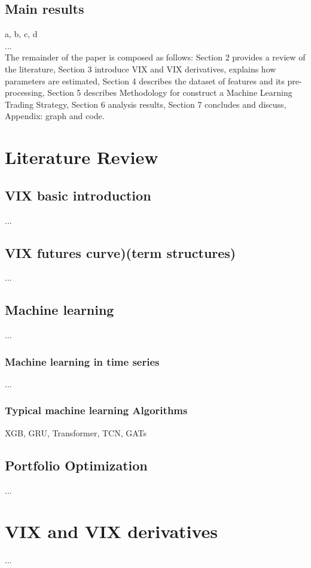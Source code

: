 \documentclass{rQUF2e}
\theoremstyle{plain}
\theoremstyle{definition}
\theoremstyle{remark}
\begin{document}
\subsection{Main results}
a, b, c, d\\
...\\
The remainder of the paper is composed as follows: Section 2 provides a review of the literature, Section 3 introduce VIX and VIX derivatives, explains how parameters are estimated, Section 4 describes the dataset of features and its pre-processing, Section 5 describes Methodology for construct a Machine Learning Trading Strategy, Section 6 analysis results, Section 7 concludes and discuss, Appendix: graph and code.


\section{Literature Review}

\subsection{VIX basic introduction}
...

\subsection{VIX futures curve)(term structures)}
...

\subsection{Machine learning}
...
\subsubsection{Machine learning in time series}
...
\subsubsection{Typical machine learning Algorithms}
XGB, GRU, Transformer, TCN, GATs
\subsection{Portfolio Optimization}
...

\section{VIX and VIX derivatives}
...
\end{document}
